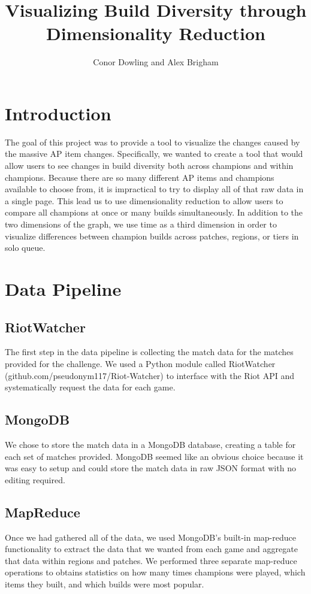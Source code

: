 \documentclass[11pt]{amsart}
\title{Visualizing Build Diversity through Dimensionality Reduction}
\author{Conor Dowling and Alex Brigham}
\begin{document}
\maketitle


\section{Introduction}

The goal of this project was to provide a tool to visualize the changes caused by the massive AP item changes. Specifically, we wanted to create a tool that would allow users to see changes in build diversity both across champions and within champions. Because there are so many different AP items and champions available to choose from, it is impractical to try to display all of that raw data in a single page. This lead us to use dimensionality reduction to allow users to compare all champions at once or many builds simultaneously. In addition to the two dimensions of the graph, we use time as a third dimension in order to visualize differences between champion builds across patches, regions, or tiers in solo queue.\\

\section{Data Pipeline}
\subsection{RiotWatcher}
The first step in the data pipeline is collecting the match data for the matches provided for the challenge. We used a Python module called RiotWatcher (github.com/pseudonym117/Riot-Watcher) to interface with the Riot API and systematically request the data for each game.\\

\subsection{MongoDB}
We chose to store the match data in a MongoDB database, creating a table for each set of matches provided. MongoDB seemed like an obvious choice because it was easy to setup and could store the match data in raw JSON format with no editing required.\\

\subsection{MapReduce}
Once we had gathered all of the data, we used MongoDB's built-in map-reduce functionality to extract the data that we wanted from each game and aggregate that data within regions and patches. We performed three separate map-reduce operations to obtains statistics on how many times champions were played, which items they built, and which builds were most popular.\\
\end{document}
